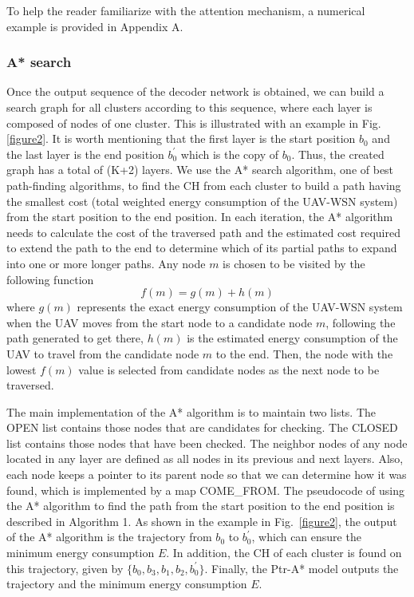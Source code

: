 \documentclass[journal]{IEEEtran}
\begin{document}
    To help the reader familiarize with the attention mechanism, a numerical example is provided in Appendix A.


    \subsubsection{A* search}
    Once the output sequence of the decoder network is obtained, we can build a search graph for all clusters according to this sequence, where each layer is composed of nodes of one cluster. This is illustrated with an example in Fig.~ \ref{figure2}. It is worth mentioning that the first layer is the start position $b_0$ and the last layer is the end position $b_0^{'}$ which is the copy of $b_0$. Thus, the created graph has a total of (K+2) layers. We use the A* search algorithm, one of best path-finding algorithms, to find the CH from each cluster to build a path having the smallest cost (total weighted energy consumption of the UAV-WSN system) from the start position to the end position. In each iteration, the A* algorithm needs to calculate the cost of the traversed path and the estimated cost required to extend the path to the end to determine which of its partial paths to expand into one or more longer paths\cite{V. Razo and H. Jacobsen}. Any node $m$ is chosen to be visited by the following function
    \begin{equation}
        f(m) = g(m) + h(m)
    \end{equation}
    where $g(m)$ represents the exact energy consumption of the UAV-WSN system when the UAV moves from the start node to a candidate node $m$, following the path generated to get there, $h(m)$ is the estimated energy consumption of the UAV to travel from the candidate node $m$ to the end. Then, the node with the lowest $f(m)$ value is selected from candidate nodes as the next node to be traversed.

    The main implementation of the A* algorithm is to maintain two lists. The OPEN list contains those nodes that are candidates for checking.  The CLOSED list contains those nodes that have been checked. The neighbor nodes of any node located in any layer are defined as all nodes in its previous and next layers. Also, each node keeps a pointer to its parent node so that we can determine how it was found, which is implemented by a map COME\_FROM. The pseudocode of using the A* algorithm to find the path from the start position to the end position is described in Algorithm 1. As shown in the example in Fig.~\ref{figure2}, the output of the A* algorithm is the trajectory from $b_0$ to $b_0^{'}$, which can ensure the minimum energy consumption $E$. In addition, the CH of each cluster is found on this trajectory, given by $\{b_0, b_3, b_1, b_2, b_0^{'}\}$. Finally, the Ptr-A* model outputs the trajectory and the minimum energy consumption $E$.
\end{document}
